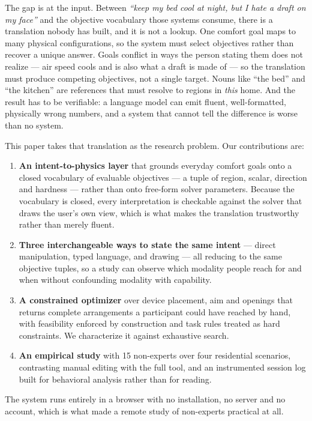 \documentclass[manuscript,review,anonymous]{acmart}
\begin{document}
The gap is at the input. Between \emph{``keep my bed cool at night, but I hate a
draft on my face''} and the objective vocabulary those systems consume, there is
a translation nobody has built, and it is not a lookup. One comfort goal maps to
many physical configurations, so the system must select objectives rather than
recover a unique answer. Goals conflict in ways the person stating them does not
realize --- air speed cools and is also what a draft is made of --- so the
translation must produce competing objectives, not a single target. Nouns like
``the bed'' and ``the kitchen'' are references that must resolve to regions in
\emph{this} home. And the result has to be verifiable: a language model can emit
fluent, well-formatted, physically wrong numbers, and a system that cannot tell
the difference is worse than no system.

This paper takes that translation as the research problem. Our contributions are:

\begin{enumerate}
  \item \textbf{An intent-to-physics layer} that grounds everyday comfort goals
    onto a closed vocabulary of evaluable objectives --- a tuple of region,
    scalar, direction and hardness --- rather than onto free-form solver
    parameters. Because the vocabulary is closed, every interpretation is
    checkable against the solver that draws the user's own view, which is what
    makes the translation trustworthy rather than merely fluent.
  \item \textbf{Three interchangeable ways to state the same intent} --- direct
    manipulation, typed language, and drawing --- all reducing to the same
    objective tuples, so a study can observe which modality people reach for and
    when without confounding modality with capability.
  \item \textbf{A constrained optimizer} over device placement, aim and openings
    that returns complete arrangements a participant could have reached by hand,
    with feasibility enforced by construction and task rules treated as hard
    constraints. We characterize it against exhaustive search.
  \item \textbf{An empirical study} with 15 non-experts over four residential
    scenarios, contrasting manual editing with the full tool, and an instrumented
    session log built for behavioral analysis rather than for reading.
\end{enumerate}

The system runs entirely in a browser with no installation, no server and no
account, which is what made a remote study of non-experts practical at all.
\end{document}
